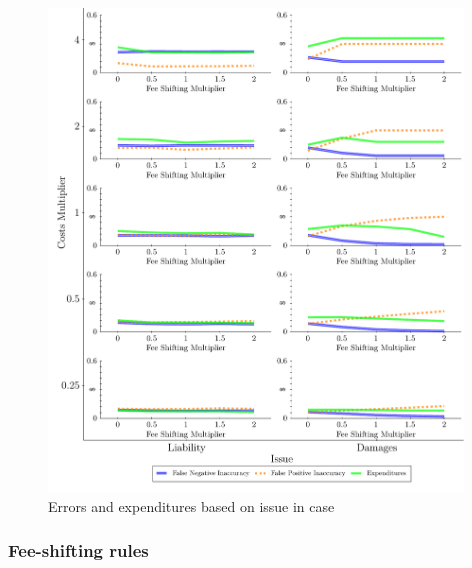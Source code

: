 \documentclass{article}
\begin{document}
\begin{figure}
\begin{minipage}{0.48\textwidth}
        \includegraphics[width=0.98\textwidth, scale=0.70, trim={0in 0in 0in 0in}, clip]{../Figures/Accuracy and Expenditures Varying Issue} %
        \caption{Errors and expenditures based on issue in case}
		\label{fig:accexp_issue}
    \end{minipage}
\end{figure}

\subsubsection{Fee-shifting rules}
\end{document}
